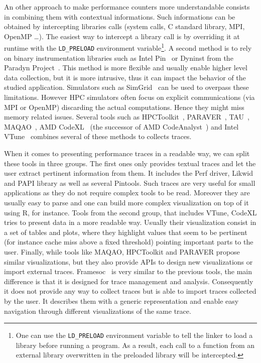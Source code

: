 An other approach to make performance counters more understandable consists in combining them with contextual informations.
Such informations can be obtained by intercepting libraries calls (system calls, C standard library, \gls{MPI}, \gls{OpenMP} \ldots).
The easiest way to intercept a library call is by overriding it at runtime with the \texttt{LD\_PRELOAD} environment variable\footnote{
    One can use the \texttt{LD\_PRELOAD} environment variable to tell the linker to load a library before running a program.
    As a result, each call to a function from an external library overwritten in the preloaded library will be intercepted.}.
A second method is to rely on binary instrumentation libraries such as \gls{Intel} \gls{Pin}~\cite{Luk05Pin} or Dyninst from the Paradyn Project~\cite{Miller95Paradyn}.
This method is more flexible and usually enable higher level data collection, but it is more intrusive, thus it can impact the behavior of the studied application.
Simulators such as \gls{SimGrid}~\cite{Casanova14Versatile} can be used to overpass these limitations.%
However \gls{HPC} simulators often focus on explicit communications (via \gls{MPI} or \gls{OpenMP}) discarding the actual computations.
Hence they might miss memory related issues.
Several tools such as \gls{HPCToolkit}~\cite{Adhianto10HPCTOOLKIT}, \gls{PARAVER}~\cite{Pillet95PARAVER}, \gls{TAU}~\cite{Shende06Tau}, \gls{MAQAO}~\cite{Djoudi05MAQAO}, \gls{AMD} \gls{CodeXL}~\cite{AMD16CodeXL} (the successor of \gls{AMD} \gls{CodeAnalyst}~\cite{Drongowski08introduction}) and \gls{Intel} \gls{VTune}~\cite{Reinders05VTune} combines several of these methods to collects traces.

When it comes to presenting performance traces in a readable way, we can split these tools in three groups.
The first ones only provides textual traces and let the user extract pertinent information from them.
It includes the \gls{Perf} driver, \gls{Likwid} and \gls{PAPI} library as well as several \glspl{Pintool}.
Such traces are very useful for small applications as they do not require complex tools to be read.
Moreover they are usually easy to parse and one can build more complex visualization on top of it using \gls{R}, for instance.
Tools from the second group, that includes \gls{VTune}, \gls{CodeXL} tries to present data in a more readable way.
Usually their visualization consist in a set of tables and plots, where they highlight values that seem to be pertinent (for instance cache miss above a fixed threshold) pointing important parts to the user.
Finally, while tools like \gls{MAQAO}, \gls{HPCToolkit} and \gls{PARAVER} propose similar visualizations, but they also provide \glspl{API} to design new visualizations or import external traces.
\gls{Framesoc}~\cite{Pagano13Trace,Pagano14frameSoC} is very similar to the previous tools, the main difference is that it is designed for trace management and analysis.
Consequently it does not provide any way to collect traces but is able to import traces collected by the user.
It describes them with a generic representation and enable easy navigation through different visualizations of the same trace.

